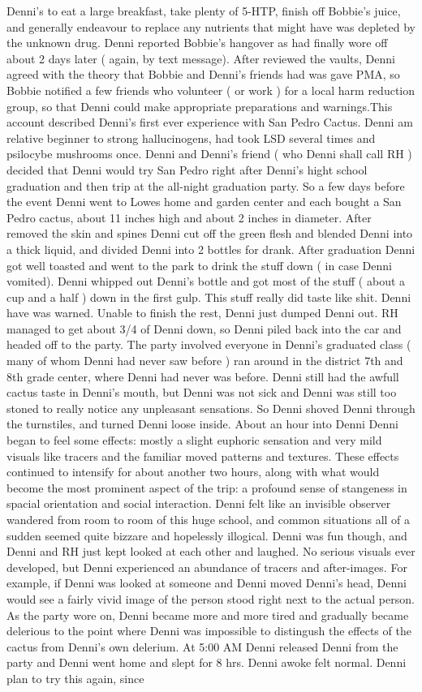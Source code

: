 \documentclass[12pt]{book}
\begin{document}
Denni's to eat a large breakfast, take plenty of 5-HTP, finish off Bobbie's juice, and generally endeavour to replace any nutrients that might have was depleted by the unknown drug. Denni reported Bobbie's hangover as had finally wore off about 2 days later ( again, by text message). After reviewed the vaults, Denni agreed with the theory that Bobbie and Denni's friends had was gave PMA, so Bobbie notified a few friends who volunteer ( or work ) for a local harm reduction group, so that Denni could make appropriate preparations and warnings.This account described Denni's first ever experience with San Pedro Cactus. Denni am relative beginner to strong hallucinogens, had took LSD several times and psilocybe mushrooms once. Denni and Denni's friend ( who Denni shall call RH ) decided that Denni would try San Pedro right after Denni's hight school graduation and then trip at the all-night graduation party. So a few days before the event Denni went to Lowes home and garden center and each bought a San Pedro cactus, about 11 inches high and about 2 inches in diameter. After removed the skin and spines Denni cut off the green flesh and blended Denni into a thick liquid, and divided Denni into 2 bottles for drank. After graduation Denni got well toasted and went to the park to drink the stuff down ( in case Denni vomited). Denni whipped out Denni's bottle and got most of the stuff ( about a cup and a half ) down in the first gulp. This stuff really did taste like shit. Denni have was warned. Unable to finish the rest, Denni just dumped Denni out. RH managed to get about 3/4 of Denni down, so Denni piled back into the car and headed off to the party. The party involved everyone in Denni's graduated class ( many of whom Denni had never saw before ) ran around in the district 7th and 8th grade center, where Denni had never was before. Denni still had the awfull cactus taste in Denni's mouth, but Denni was not sick and Denni was still too stoned to really notice any unpleasant sensations. So Denni shoved Denni through the turnstiles, and turned Denni loose inside. About an hour into Denni Denni began to feel some effects: mostly a slight euphoric sensation and very mild visuals like tracers and the familiar moved patterns and textures. These effects continued to intensify for about another two hours, along with what would become the most prominent aspect of the trip: a profound sense of stangeness in spacial orientation and social interaction. Denni felt like an invisible observer wandered from room to room of this huge school, and common situations all of a sudden seemed quite bizzare and hopelessly illogical. Denni was fun though, and Denni and RH just kept looked at each other and laughed. No serious visuals ever developed, but Denni experienced an abundance of tracers and after-images. For example, if Denni was looked at someone and Denni moved Denni's head, Denni would see a fairly vivid image of the person stood right next to the actual person. As the party wore on, Denni became more and more tired and gradually became delerious to the point where Denni was impossible to distingush the effects of the cactus from Denni's own delerium. At 5:00 AM Denni released Denni from the party and Denni went home and slept for 8 hrs. Denni awoke felt normal. Denni plan to try this again, since 
\end{document}
